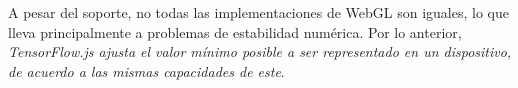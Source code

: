 A pesar del soporte, no todas las implementaciones de WebGL son
iguales, lo que lleva principalmente a problemas de estabilidad numérica.
Por lo anterior,
\emph{TensorFlow.js ajusta el valor mínimo posible a ser representado en un dispositivo, de acuerdo a las mismas capacidades de este}.



